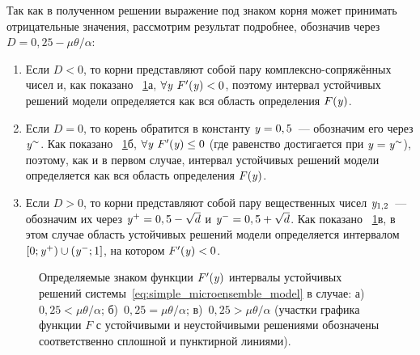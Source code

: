 Так как в полученном решении выражение под знаком корня может принимать отрицательные значения, рассмотрим результат подробнее, обозначив через $D = 0,25 - \mu \theta / \alpha$:
\begin{enumerate}[wide]
    \item Если $D < 0$, то корни представляют собой пару комплексно-сопряжённых чисел и, как показано \onfigure~\ref{fig:analysis_sigm_stability}а, $\forall\mathit{y}\ F^{\prime}(\mathit{y}) < 0$, поэтому интервал устойчивых решений модели определяется как вся область определения $F(\mathit{y})$.
    \item Если $D = 0$, то корень обратится в константу $\mathit{y} = 0,5$~--- обозначим его через $\mathit{y}^{\sim}$. Как показано \onfigure~\ref{fig:analysis_sigm_stability}б, $\forall\mathit{y}\ F^{\prime}(\mathit{y}) \le 0$ (где равенство достигается при $\mathit{y} = \mathit{y}^{\sim}$), поэтому, как и в первом случае, интервал устойчивых решений модели определяется как вся область определения $F(\mathit{y})$.
    \item Если $D > 0$, то корни представляют собой пару вещественных чисел $\mathit{y}_{1,2}$~--- обозначим их через $\mathit{y}^{+} = 0,5 - \sqrt{d}$ и $\mathit{y}^{-} = 0,5 + \sqrt{d}$. Как показано \onfigure~\ref{fig:analysis_sigm_stability}в, в этом случае область устойчивых решений модели определяется интервалом $\left[0; \mathit{y}^{+}\right) \cup \left(\mathit{y}^{-}; 1\right]$, на котором $F^{\prime}(\mathit{y}) < 0$.
\end{enumerate}

\begin{figure}[ht]
    \begin{minipage}{\textwidth}
        \caption{Определяемые знаком функции $F^{\prime}(\mathit{y})$ интервалы устойчивых решений системы~\eqref{eq:simple_microensemble_model} в случае: а)~$0,25 < \mu \theta / \alpha$; б)~$0,25 = \mu \theta / \alpha$; в)~$0,25 > \mu \theta / \alpha$ (участки графика функции $F$ с устойчивыми и неустойчивыми решениями обозначены соответственно сплошной и пунктирной линиями).}
        \label{fig:analysis_sigm_stability}
    \end{minipage}
\end{figure}

